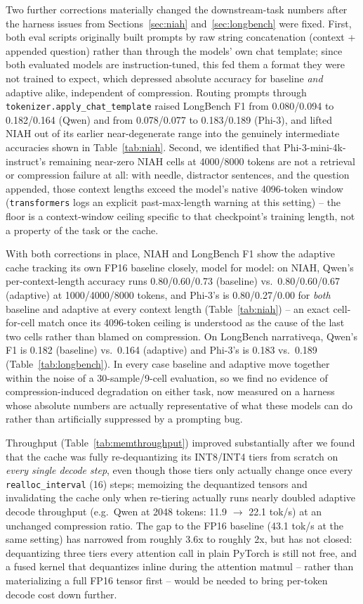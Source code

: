 \documentclass[conference]{IEEEtran}
\begin{document}
Two further corrections materially changed the downstream-task numbers after the harness
issues from Sections~\ref{sec:niah} and~\ref{sec:longbench} were fixed. First, both eval
scripts originally built prompts by raw string concatenation (context + appended
question) rather than through the models' own chat template; since both evaluated models
are instruction-tuned, this fed them a format they were not trained to expect, which
depressed absolute accuracy for baseline \emph{and} adaptive alike, independent of
compression. Routing prompts through \texttt{tokenizer.apply\_chat\_template} raised
LongBench F1 from 0.080/0.094 to 0.182/0.164 (Qwen) and from 0.078/0.077 to 0.183/0.189
(Phi-3), and lifted NIAH out of its earlier near-degenerate range into the genuinely
intermediate accuracies shown in Table~\ref{tab:niah}. Second, we identified that
Phi-3-mini-4k-instruct's remaining near-zero NIAH cells at 4000/8000 tokens are not a
retrieval or compression failure at all: with needle, distractor sentences, and the
question appended, those context lengths exceed the model's native 4096-token window
(\texttt{transformers} logs an explicit past-max-length warning at this setting) -- the
floor is a context-window ceiling specific to that checkpoint's training length, not a
property of the task or the cache.

With both corrections in place, NIAH and LongBench F1 show the adaptive cache tracking
its own FP16 baseline closely, model for model: on NIAH, Qwen's per-context-length
accuracy runs 0.80/0.60/0.73 (baseline) vs.\ 0.80/0.60/0.67 (adaptive) at 1000/4000/8000
tokens, and Phi-3's is 0.80/0.27/0.00 for \emph{both} baseline and adaptive at every
context length (Table~\ref{tab:niah}) -- an exact cell-for-cell match once its
4096-token ceiling is understood as the cause of the last two cells rather than blamed on
compression. On LongBench narrativeqa, Qwen's F1 is 0.182 (baseline) vs.\ 0.164
(adaptive) and Phi-3's is 0.183 vs.\ 0.189 (Table~\ref{tab:longbench}). In every case
baseline and adaptive move together within the noise of a 30-sample/9-cell evaluation, so
we find no evidence of compression-induced degradation on either task, now measured on
a harness whose absolute numbers are actually representative of what these models can do
rather than artificially suppressed by a prompting bug.

Throughput (Table~\ref{tab:memthroughput}) improved substantially after we found that the
cache was fully re-dequantizing its INT8/INT4 tiers from scratch on \emph{every single
decode step}, even though those tiers only actually change once every
\texttt{realloc\_interval} (16) steps; memoizing the dequantized tensors and invalidating
the cache only when re-tiering actually runs nearly doubled adaptive decode throughput
(e.g.\ Qwen at 2048 tokens: 11.9 $\to$ 22.1 tok/s) at an unchanged compression ratio. The
gap to the FP16 baseline (43.1 tok/s at the same setting) has narrowed from roughly 3.6x
to roughly 2x, but has not closed: dequantizing three tiers every attention call in plain
PyTorch is still not free, and a fused kernel that dequantizes inline during the attention
matmul -- rather than materializing a full FP16 tensor first -- would be needed to bring
per-token decode cost down further.
\end{document}
